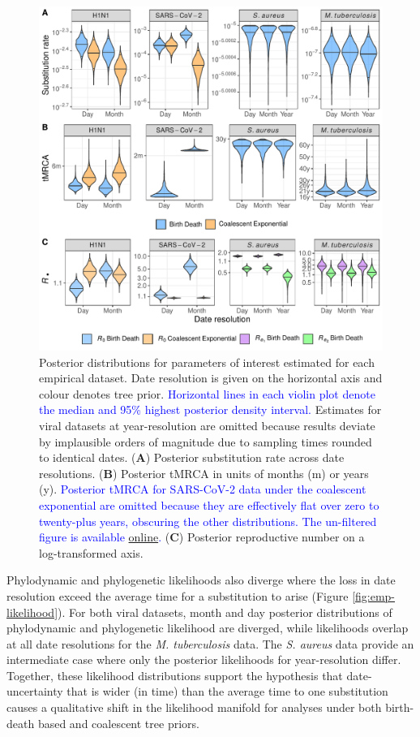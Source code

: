 \documentclass[12pt]{article}
\begin{document}
\begin{spacing}{2}
\begin{figure}[H]
    \centering
    \includegraphics[width=\textwidth]{empirical_parms.pdf}
    \caption{Posterior distributions for parameters of interest estimated for each empirical dataset. Date resolution is given on the horizontal axis and colour denotes tree prior. \textcolor{blue}{Horizontal lines in each violin plot denote the median and 95\% highest posterior density interval.} Estimates for viral datasets at year-resolution are omitted because results deviate by implausible orders of magnitude due to sampling times rounded to identical dates. (\textbf{A}) Posterior substitution rate across date resolutions. (\textbf{B}) Posterior tMRCA in units of months (m) or years (y). \textcolor{blue}{Posterior tMRCA for SARS-CoV-2 data under the coalescent exponential are omitted because they are effectively flat over zero to twenty-plus years, obscuring the other distributions. The un-filtered figure is available \href{https://github.com/LeoFeatherstone/pdp/blob/main/figures/empirical_parms_covid_ce_unfiltered.pdf}{online}.}  (\textbf{C}) Posterior reproductive number on a log-transformed axis.}
    \label{fig:emp-parm}
\end{figure}

Phylodynamic and phylogenetic likelihoods also diverge where the loss in date resolution exceed the average time for a substitution to arise (Figure \ref{fig:emp-likelihood}). For both viral datasets, month and day posterior distributions of phylodynamic and phylogenetic likelihood are diverged, while likelihoods overlap at all date resolutions for the \textit{M. tuberculosis} data. The \textit{S. aureus} data provide an intermediate case where only the posterior likelihoods for year-resolution differ. Together, these likelihood distributions support the hypothesis that date-uncertainty that is wider (in time) than the average time to one substitution causes a qualitative shift in the likelihood manifold for analyses under both birth-death based and coalescent tree priors.


\end{spacing}
\end{document}
